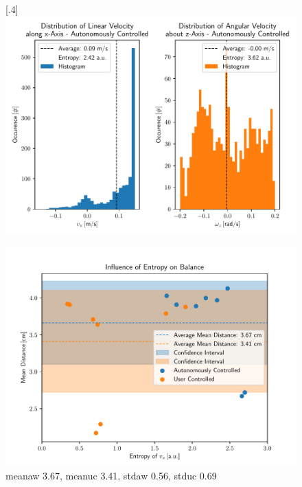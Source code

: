 \begin{figure}[h]
	[.4\linewidth]{\includegraphics[scale=.35]{chapters/05_experiments/04_autonomous_walking/semantic_walk_01_entropy.pdf}}
	\caption{}
	\label{fig::53_aw_additional}
\end{figure}
\begin{figure}[h]
	\centering
	\includegraphics[scale=.6]{chapters/05_experiments/04_autonomous_walking/entropy_against_balance.pdf}
	\caption{meanaw 3.67, meanuc 3.41, stdaw 0.56, stduc 0.69}
	\label{fig::542_entropy_balance}
\end{figure}

